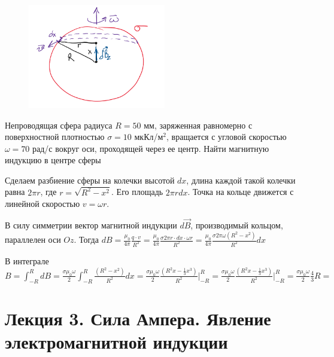 \documentclass[12pt]{article}
\begin{document}
\begin{minipage}{\textwidth}
    \begin{figure}
        \includegraphics[width=6cm]{physics2/images/physics2_2025_02_17_4}
    \end{figure}

    \Ex Непроводящая сфера радиуса $R = 50$ мм, заряженная равномерно с поверхностной плотностью $\sigma = 10$ мкКл/м$^2$, 
    вращается с угловой скоростью $\omega = 70$ рад/с вокруг оси, проходящей через ее центр. Найти магнитную индукцию в центре сферы

    \mediumvspace

    Сделаем разбиение сферы на колечки высотой $dx$, длина каждой такой колечки равна $2\pi r$, где $r = \sqrt{R^2 - x^2}$.
    Его площадь $2\pi r dx$. Точка на кольце движется с линейной скоростью $v = \omega r$.
\end{minipage}

В силу симметрии вектор магнитной индукции $d\vec{B}$, производимый кольцом, параллелен оси $Oz$. 
Тогда $dB = \frac{\mu_0}{4\pi} \frac{q \cdot v}{R^2} = \frac{\mu_0}{4\pi} \frac{\sigma 2\pi r \cdot dx \cdot \omega r}{R^2} = 
\frac{\mu_0}{4\pi} \frac{\sigma 2\pi \omega (R^2 - x^2)}{R^2} dx$

В интеграле $B = \int_{-R}^R dB = \frac{\sigma \mu_0 \omega}{2} \int_{-R}^R \frac{(R^2 - x^2)}{R^2} dx = 
\frac{\sigma \mu_0 \omega}{2} \frac{(R^2 x - \frac{1}{3} x^3)}{R^2} \Big|_{-R}^R = 
\frac{\sigma \mu_0 \omega}{2} \frac{(R^2 x - \frac{1}{3} x^3)}{R^2} \Big|_{-R}^R = 
\frac{\sigma \mu_0 \omega}{2} \frac{4}{3} R = $ 

\clearpage








\section{Лекция 3. Сила Ампера. Явление электромагнитной индукции}
\end{document}
